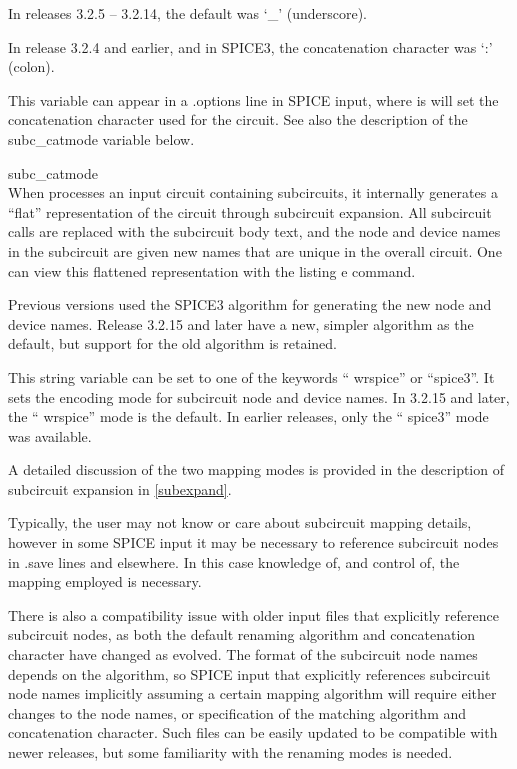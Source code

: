 \begin{description}
In releases 3.2.5 -- 3.2.14, the default was `{\vt \_}' (underscore).

In release 3.2.4 and earlier, and in SPICE3, the concatenation
character was `{\vt :}' (colon).

This variable can appear in a {\vt .options} line in SPICE input,
where is will set the concatenation character used for the circuit. 
See also the description of the {\et subc\_catmode} variable below.

\item{\et subc\_catmode}\\
When {\WRspice} processes an input circuit containing subcircuits, it
internally generates a ``flat'' representation of the circuit through
subcircuit expansion.  All subcircuit calls are replaced with the
subcircuit body text, and the node and device names in the subcircuit
are given new names that are unique in the overall circuit.  One can
view this flattened representation with the {\cb listing e} command.

Previous {\WRspice} versions used the SPICE3 algorithm for generating
the new node and device names.  Release 3.2.15 and later have a new,
simpler algorithm as the default, but support for the old algorithm is
retained.

This string variable can be set to one of the keywords ``{\vt
wrspice}'' or ``{\vt spice3}''.  It sets the encoding mode for
subcircuit node and device names.  In 3.2.15 and later, the ``{\vt
wrspice}'' mode is the default.  In earlier releases, only the ``{\vt
spice3}'' mode was available.

A detailed discussion of the two mapping modes is provided in the
description of subcircuit expansion in \ref{subexpand}.

Typically, the user may not know or care about subcircuit mapping
details, however in some SPICE input it may be necessary to reference
subcircuit nodes in {\vt .save} lines and elsewhere.  In this case
knowledge of, and control of, the mapping employed is necessary.

There is also a compatibility issue with older {\WRspice} input files
that explicitly reference subcircuit nodes, as both the default
renaming algorithm and concatenation character have changed as
{\WRspice} evolved.  The format of the subcircuit node names depends
on the algorithm, so SPICE input that explicitly references subcircuit
node names implicitly assuming a certain mapping algorithm will
require either changes to the node names, or specification of the
matching algorithm and concatenation character.  Such files can be
easily updated to be compatible with newer {\WRspice} releases, but
some familiarity with the renaming modes is needed.


\end{description}
